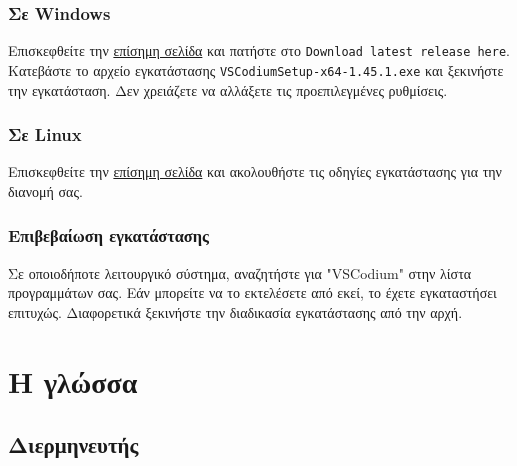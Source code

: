 \documentclass[a4paper,10pt]{report}
\begin{document}
\subsubsection{Σε Windows}
Επισκεφθείτε την \href{https://tinyurl.com/ybqxegq3}{επίσημη σελίδα}
και πατήστε στο \lstinline{Download latest release here}.
Κατεβάστε το αρχείο εγκατάστασης
\lstinline{VSCodiumSetup-x64-1.45.1.exe} και ξεκινήστε
την εγκατάσταση. Δεν χρειάζετε να αλλάξετε τις προεπιλεγμένες ρυθμίσεις.
\subsubsection{Σε Linux}
Επισκεφθείτε την \href{https://tinyurl.com/ybqxegq3}{επίσημη σελίδα} και
ακολουθήστε τις οδηγίες εγκατάστασης για την διανομή σας.
\subsubsection{Επιβεβαίωση εγκατάστασης}
Σε οποιοδήποτε λειτουργικό σύστημα, αναζητήστε για "VSCodium" στην λίστα
προγραμμάτων σας. Εάν μπορείτε να το εκτελέσετε από εκεί, το έχετε εγκαταστήσει
επιτυχώς. Διαφορετικά ξεκινήστε την διαδικασία εγκατάστασης από την αρχή.
\section{Η γλώσσα}
\subsection{Διερμηνευτής}
\end{document}
